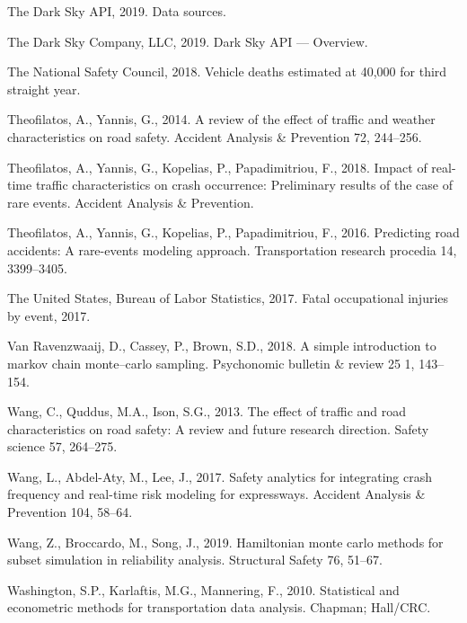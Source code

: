 \documentclass[12pt]{book}
\numberwithin{equation}{chapter}
\begin{document}
\leavevmode\hypertarget{ref-darkskyds}{}%
The Dark Sky API, 2019. Data sources.

\leavevmode\hypertarget{ref-darksky}{}%
The Dark Sky Company, LLC, 2019. Dark Sky API --- Overview.

\leavevmode\hypertarget{ref-nsc2018}{}%
The National Safety Council, 2018. Vehicle deaths estimated at 40,000 for third straight year.

\leavevmode\hypertarget{ref-theofilatos2014review}{}%
Theofilatos, A., Yannis, G., 2014. A review of the effect of traffic and weather characteristics on road safety. Accident Analysis \& Prevention 72, 244--256.

\leavevmode\hypertarget{ref-theofilatos2018impact}{}%
Theofilatos, A., Yannis, G., Kopelias, P., Papadimitriou, F., 2018. Impact of real-time traffic characteristics on crash occurrence: Preliminary results of the case of rare events. Accident Analysis \& Prevention.

\leavevmode\hypertarget{ref-theofilatos2016predicting}{}%
Theofilatos, A., Yannis, G., Kopelias, P., Papadimitriou, F., 2016. Predicting road accidents: A rare-events modeling approach. Transportation research procedia 14, 3399--3405.

\leavevmode\hypertarget{ref-bols}{}%
The United States, Bureau of Labor Statistics, 2017. Fatal occupational injuries by event, 2017.

\leavevmode\hypertarget{ref-van2018simple}{}%
Van Ravenzwaaij, D., Cassey, P., Brown, S.D., 2018. A simple introduction to markov chain monte--carlo sampling. Psychonomic bulletin \& review 25 1, 143--154.

\leavevmode\hypertarget{ref-wang2013effect}{}%
Wang, C., Quddus, M.A., Ison, S.G., 2013. The effect of traffic and road characteristics on road safety: A review and future research direction. Safety science 57, 264--275.

\leavevmode\hypertarget{ref-wang2017safety}{}%
Wang, L., Abdel-Aty, M., Lee, J., 2017. Safety analytics for integrating crash frequency and real-time risk modeling for expressways. Accident Analysis \& Prevention 104, 58--64.

\leavevmode\hypertarget{ref-wang2019hamiltonian}{}%
Wang, Z., Broccardo, M., Song, J., 2019. Hamiltonian monte carlo methods for subset simulation in reliability analysis. Structural Safety 76, 51--67.

\leavevmode\hypertarget{ref-washington2010statistical}{}%
Washington, S.P., Karlaftis, M.G., Mannering, F., 2010. Statistical and econometric methods for transportation data analysis. Chapman; Hall/CRC.
\end{document}
